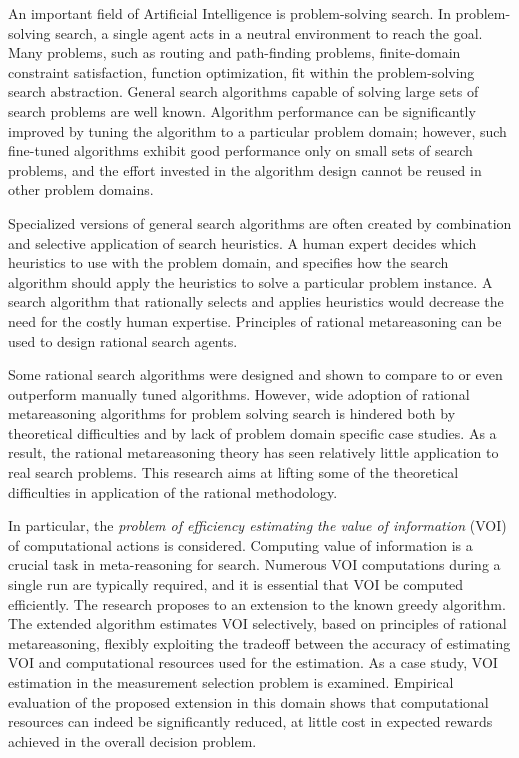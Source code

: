 An important field of Artificial Intelligence is
problem-solving search. In problem-solving search, a single agent acts
in a neutral environment to reach the goal. Many problems, such as
routing and path-finding problems, finite-domain constraint
satisfaction, function optimization, fit within the problem-solving
search abstraction. General search algorithms capable of solving large
sets of search problems are well known. Algorithm performance can be
significantly improved by tuning the algorithm to a particular problem
domain; however, such fine-tuned algorithms exhibit good performance
only on small sets of search problems, and the effort invested in the
algorithm design cannot be reused in other problem domains.

Specialized versions of general search algorithms are often created by
combination and selective application of search  heuristics.
A human expert decides which heuristics to use with the
problem domain, and specifies how the search algorithm should apply
the heuristics to solve a particular problem instance. A search
algorithm that rationally selects and applies heuristics would decrease
the need for the costly human expertise. Principles of rational
metareasoning can be used to design rational search agents.  

Some rational search algorithms were designed and shown to compare to
or even outperform manually tuned algorithms. However, wide adoption
of rational metareasoning algorithms for problem solving search is
hindered both by theoretical difficulties and by lack of problem
domain specific case studies. As a result, the rational metareasoning
theory has seen relatively little application to real search
problems. This research aims at lifting some of the theoretical
difficulties in application of the rational methodology. 

In particular, the \emph{problem of efficiency estimating the value of
information} (VOI) of computational actions is considered. Computing value of
information is a crucial task in meta-reasoning for search. Numerous
VOI computations during a single run are typically required, and it is
essential that VOI be computed efficiently. The research proposes to
an extension to the known greedy algorithm. The extended algorithm
estimates VOI selectively, based on principles of rational
metareasoning, flexibly exploiting the tradeoff between the
accuracy of estimating VOI and computational resources used for the
estimation. As a case study, VOI estimation in the measurement selection
problem is examined.  Empirical evaluation of the proposed extension in this
domain shows that computational resources can indeed be significantly
reduced, at little cost in expected rewards achieved in the overall
decision problem.

